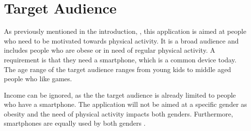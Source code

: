 \section{Target Audience}\label{section:targetaudience}
As previously mentioned in the introduction, , this application is aimed at people who need to be motivated towards physical activity.
It is a broad audience and includes people who are obese or in need of regular physical activity.
A requirement is that they need a smartphone, which is a common device today.
The age range of the target audience ranges from young kids to middle aged people who like games.

Income can be ignored, as the the target audience is already limited to people who have a smartphone.
The application will not be aimed at a specific gender as obesity and the need of physical activity impacts both genders. 
Furthermore, smartphones are equally used by both genders \citep{misc:smartphoneuse}.